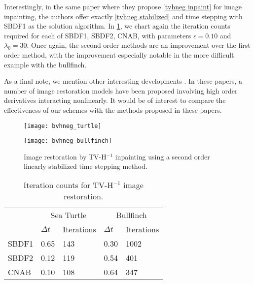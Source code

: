 Interestingly, in the same paper where they propose \cref{tvhneg inpaint} for image inpainting, the authors offer exactly \cref{tvhneg stabilized} and time stepping with SBDF1 as the solution algorithm. In \cref{tab:bvhneg iter counts}, we chart again the iteration counts required for each of SBDF1, SBDF2, CNAB, with parameters $\epsilon=0.10$ and $\lambda_0=30$. Once again, the second order methods are an improvement over the first order method, with the improvement especially notable in the more difficult example with the bullfinch. 

As a final note, we mention other interesting developments \cite{bredies2010total,papafitsoros2014combined,papafitsoros2013combined}. In these papers, a number of image restoration models have been proposed involving high order derivatives interacting nonlinearly. It would be of interest to compare the effectiveness of our schemes with the methods proposed in these papers.

\begin{figure}[htb!]
	\centering
\begin{minipage}{0.65\textwidth}
	\texttt{[image: bvhneg\_turtle]}
\end{minipage}
\begin{minipage}{0.65\textwidth}
	\texttt{[image: bvhneg\_bullfinch]}
\end{minipage}
\caption[Image restoration by TV-H$^{-1}$ inpainting]{Image restoration by TV-H$^{-1}$ inpainting using a second order linearly stabilized time stepping method.}
\label{fig:bvhneg inpainting}
\end{figure}

\begin{table}[htb!]
\caption[Iteration counts for TV-H$^{-1}$ image restoration]{Iteration counts for TV-H$^{-1}$ image restoration.}
        \centering\begin{tabular}{lll ll} \toprule[1.25pt]
& \multicolumn{2}{c}{Sea Turtle} & \multicolumn{2}{c}{Bullfinch}
\\
& $\Delta t$ & Iterations & $\Delta t$ & Iterations
\\ \midrule
SBDF1 & 0.65 & 143 & 0.30 & 1002
\\
SBDF2& 0.12 & 119 & 0.54 & 401 
\\             
CNAB & 0.10 & 108 & 0.64 & 347
\\ \bottomrule[1.25pt]
\end{tabular}
\label{tab:bvhneg iter counts}
\end{table}


